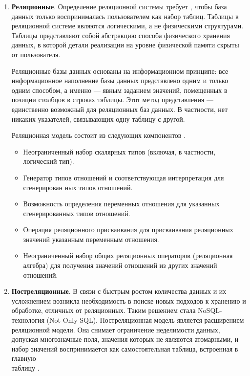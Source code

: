 \begin{enumerate}[label*=\arabic*.]
\begin{enumerate}[label*=\arabic*.]
	\end{enumerate}
	
	\item \textbf{Реляционные}. \newline
	Определение реляционной системы требует \cite{Date_old}, чтобы база данных только воспринималась пользователем как набор таблиц. Таблицы в реляционной системе являются логическими, а не физическими структурами. Таблицы представляют собой абстракцию способа физического хранения данных, в которой детали реализации на уровне физической памяти скрыты от пользователя.
	
	Реляционные базы данных основаны на информационном принципе: все информационное наполнение базы данных представлено одним и только одним способом, а именно --- явным заданием значений, помещенных в позиции столбцов в строках таблицы. Этот метод представления --- единственно возможный для реляционных баз данных. В частности, нет никаких указателей, связывающих одну таблицу с другой.
	
	Реляционная модель состоит из следующих компонентов \cite{Date_old}.
	
	\begin{itemize}[label*=---]
		\item  Неограниченный набор скалярных типов (включая, в частности, логический тип).
		\item  Генератор типов отношений и соответствующая интерпретация для сгенерирован ных типов отношений.
		\item  Возможность определения переменных отношения для указанных сгенерированных типов отношений.
		\item  Операция реляционного присваивания для присваивания реляционных значений указанным переменным отношения.
		\item  Неограниченный набор общих реляционных операторов (реляционная алгебра) для получения значений отношений из других значений отношений.
		
	\end{itemize}
	
	
	\item \textbf{Постреляционные}. \newline
	В связи с быстрым ростом количества данных и их усложнением возникла необходимость в поиске новых подходов к хранению и обработке, отличных от реляционных. Таким решением стала NoSQL-технология (Not Only SQL). Постреляционная модель является расширением реляционной модели. Она снимает ограничение неделимости данных, допуская многозначные поля, значения которых не являются атомарными, и набор значений воспринимается как самостоятельная таблица, встроенная в главную \\таблицу \cite{Markin}.
	

\end{enumerate}
